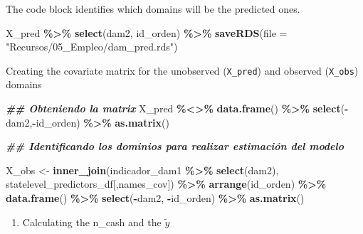 \documentclass[
  12pt,
]{book}
\newenvironment{Shaded}{\begin{snugshade}}{\end{snugshade}}
\newcommand{\AttributeTok}[1]{\textcolor[rgb]{0.13,0.29,0.53}{#1}}
\newcommand{\DocumentationTok}[1]{\textcolor[rgb]{0.56,0.35,0.01}{\textbf{\textit{#1}}}}
\newcommand{\FunctionTok}[1]{\textcolor[rgb]{0.13,0.29,0.53}{\textbf{#1}}}
\newcommand{\NormalTok}[1]{#1}
\newcommand{\OtherTok}[1]{\textcolor[rgb]{0.56,0.35,0.01}{#1}}
\newcommand{\SpecialCharTok}[1]{\textcolor[rgb]{0.81,0.36,0.00}{\textbf{#1}}}
\newcommand{\StringTok}[1]{\textcolor[rgb]{0.31,0.60,0.02}{#1}}
\providecommand{\tightlist}{%
  \setlength{\itemsep}{0pt}\setlength{\parskip}{0pt}}
\begin{document}
The code block identifies which domains will be the predicted ones.

\begin{Shaded}
\begin{Highlighting}[]
\NormalTok{X\_pred }\SpecialCharTok{\%\textgreater{}\%} \FunctionTok{select}\NormalTok{(dam2, id\_orden) }\SpecialCharTok{\%\textgreater{}\%} 
  \FunctionTok{saveRDS}\NormalTok{(}\AttributeTok{file =} \StringTok{"Recursos/05\_Empleo/dam\_pred.rds"}\NormalTok{)}
\end{Highlighting}
\end{Shaded}

Creating the covariate matrix for the unobserved (\texttt{X\_pred}) and observed (\texttt{X\_obs}) domains

\begin{Shaded}
\begin{Highlighting}[]
\DocumentationTok{\#\# Obteniendo la matrix }
\NormalTok{X\_pred }\SpecialCharTok{\%\textless{}\textgreater{}\%}
  \FunctionTok{data.frame}\NormalTok{() }\SpecialCharTok{\%\textgreater{}\%}
  \FunctionTok{select}\NormalTok{(}\SpecialCharTok{{-}}\NormalTok{dam2,}\SpecialCharTok{{-}}\NormalTok{id\_orden)  }\SpecialCharTok{\%\textgreater{}\%}  \FunctionTok{as.matrix}\NormalTok{()}

\DocumentationTok{\#\# Identificando los dominios para realizar estimación del modelo}

\NormalTok{X\_obs }\OtherTok{\textless{}{-}} \FunctionTok{inner\_join}\NormalTok{(indicador\_dam1 }\SpecialCharTok{\%\textgreater{}\%} \FunctionTok{select}\NormalTok{(dam2),}
\NormalTok{                    statelevel\_predictors\_df[,names\_cov]) }\SpecialCharTok{\%\textgreater{}\%}
  \FunctionTok{arrange}\NormalTok{(id\_orden) }\SpecialCharTok{\%\textgreater{}\%}
  \FunctionTok{data.frame}\NormalTok{() }\SpecialCharTok{\%\textgreater{}\%}
  \FunctionTok{select}\NormalTok{(}\SpecialCharTok{{-}}\NormalTok{dam2, }\SpecialCharTok{{-}}\NormalTok{id\_orden)  }\SpecialCharTok{\%\textgreater{}\%}  \FunctionTok{as.matrix}\NormalTok{()}
\end{Highlighting}
\end{Shaded}

\begin{enumerate}
\def\labelenumi{\arabic{enumi}.}
\setcounter{enumi}{2}
\tightlist
\item
  Calculating the n\_cash and the \(\tilde{y}\)
\end{enumerate}
\end{document}
